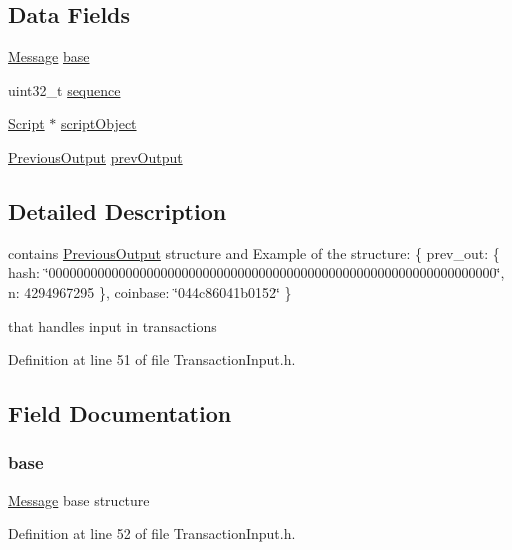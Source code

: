 \subsection*{Data Fields}
\begin{DoxyCompactItemize}
\item 
\hyperlink{struct_message}{Message} \hyperlink{struct_transaction_input_a8987f797adf70c3e174fd64cc68bc933}{base}
\item 
uint32\_\-t \hyperlink{struct_transaction_input_a0ab03ef2cc38198d3666a992a245fddf}{sequence}
\item 
\hyperlink{struct_byte_array}{Script} $\ast$ \hyperlink{struct_transaction_input_ac420de2766b1358b5e325cfc21a76aa3}{scriptObject}
\item 
\hyperlink{struct_previous_output}{PreviousOutput} \hyperlink{struct_transaction_input_a20cfe78368fb9825302ce5cdb076f8b1}{prevOutput}
\end{DoxyCompactItemize}


\subsection{Detailed Description}
contains \hyperlink{struct_previous_output}{PreviousOutput} structure and Example of the structure: \{ prev\_\-out: \{ hash: \char`\"{}0000000000000000000000000000000000000000000000000000000000000000\char`\"{}, n: 4294967295 \}, coinbase: \char`\"{}044c86041b0152\char`\"{} \} 

that handles input in transactions 

Definition at line 51 of file TransactionInput.h.



\subsection{Field Documentation}
\hypertarget{struct_transaction_input_a8987f797adf70c3e174fd64cc68bc933}{
\subsubsection[{base}]{ {\bf base}}}
\label{struct_transaction_input_a8987f797adf70c3e174fd64cc68bc933}
\hyperlink{struct_message}{Message} base structure 

Definition at line 52 of file TransactionInput.h.

